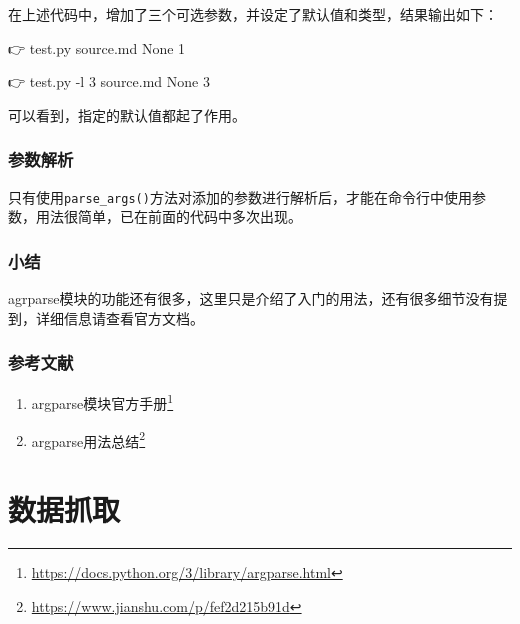 \documentclass[]{ctexbook}
\newenvironment{Shaded}{\begin{snugshade}}{\end{snugshade}}
\newcommand{\ExtensionTok}[1]{#1}
\newcommand{\NormalTok}[1]{#1}
\providecommand{\tightlist}{%
  \setlength{\itemsep}{0pt}\setlength{\parskip}{0pt}}
\renewcommand{\href}[2]{#2\footnote{\url{#1}}}
\begin{document}
在上述代码中，增加了三个可选参数，并设定了默认值和类型，结果输出如下：

\begin{Shaded}
\begin{Highlighting}[]
\NormalTok{ 👉  }\ExtensionTok{test.py}
\ExtensionTok{source.md}
\ExtensionTok{None}
\ExtensionTok{1}

\NormalTok{ 👉  }\ExtensionTok{test.py}\NormalTok{ -l 3}
\ExtensionTok{source.md}
\ExtensionTok{None}
\ExtensionTok{3}
\end{Highlighting}
\end{Shaded}

可以看到，指定的默认值都起了作用。

\hypertarget{ux53c2ux6570ux89e3ux6790}{%
\section{参数解析}\label{ux53c2ux6570ux89e3ux6790}}

只有使用\texttt{parse\_args()}方法对添加的参数进行解析后，才能在命令行中使用参数，用法很简单，已在前面的代码中多次出现。

\hypertarget{ux5c0fux7ed3}{%
\section{小结}\label{ux5c0fux7ed3}}

agrparse模块的功能还有很多，这里只是介绍了入门的用法，还有很多细节没有提到，详细信息请查看官方文档。

\hypertarget{ux53c2ux8003ux6587ux732e}{%
\section{参考文献}\label{ux53c2ux8003ux6587ux732e}}

\begin{enumerate}
\def\labelenumi{\arabic{enumi}.}
\tightlist
\item
  \href{https://docs.python.org/3/library/argparse.html}{argparse模块官方手册}
\item
  \href{https://www.jianshu.com/p/fef2d215b91d}{argparse用法总结}
\end{enumerate}

\hypertarget{part-ux6570ux636eux6293ux53d6}{%
\part{数据抓取}\label{part-ux6570ux636eux6293ux53d6}}
\end{document}
